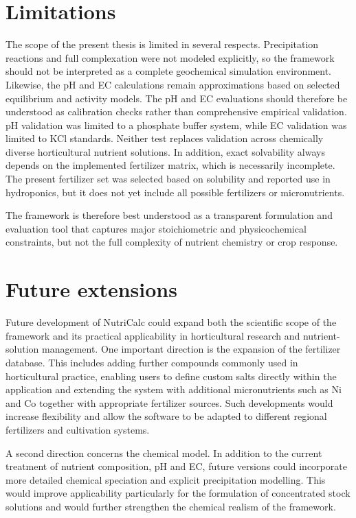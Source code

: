 \documentclass[
  letterpaper,
  DIV=11,
  numbers=noendperiod]{scrreprt}
\begin{document}
\section{Limitations}\label{limitations}

The scope of the present thesis is limited in several respects.
Precipitation reactions and full complexation were not modeled
explicitly, so the framework should not be interpreted as a complete
geochemical simulation environment. Likewise, the pH and EC calculations
remain approximations based on selected equilibrium and activity models.
The pH and EC evaluations should therefore be understood as calibration
checks rather than comprehensive empirical validation. pH validation was
limited to a phosphate buffer system, while EC validation was limited to
KCl standards. Neither test replaces validation across chemically
diverse horticultural nutrient solutions. In addition, exact solvability
always depends on the implemented fertilizer matrix, which is
necessarily incomplete. The present fertilizer set was selected based on
solubility and reported use in hydroponics, but it does not yet include
all possible fertilizers or micronutrients.

The framework is therefore best understood as a transparent formulation
and evaluation tool that captures major stoichiometric and
physicochemical constraints, but not the full complexity of nutrient
chemistry or crop response.

\section{Future extensions}\label{future-extensions}

Future development of NutriCalc could expand both the scientific scope
of the framework and its practical applicability in horticultural
research and nutrient-solution management. One important direction is
the expansion of the fertilizer database. This includes adding further
compounds commonly used in horticultural practice, enabling users to
define custom salts directly within the application and extending the
system with additional micronutrients such as Ni and Co together with
appropriate fertilizer sources. Such developments would increase
flexibility and allow the software to be adapted to different regional
fertilizers and cultivation systems.

A second direction concerns the chemical model. In addition to the
current treatment of nutrient composition, pH and EC, future versions
could incorporate more detailed chemical speciation and explicit
precipitation modelling. This would improve applicability particularly
for the formulation of concentrated stock solutions and would further
strengthen the chemical realism of the framework.
\end{document}
